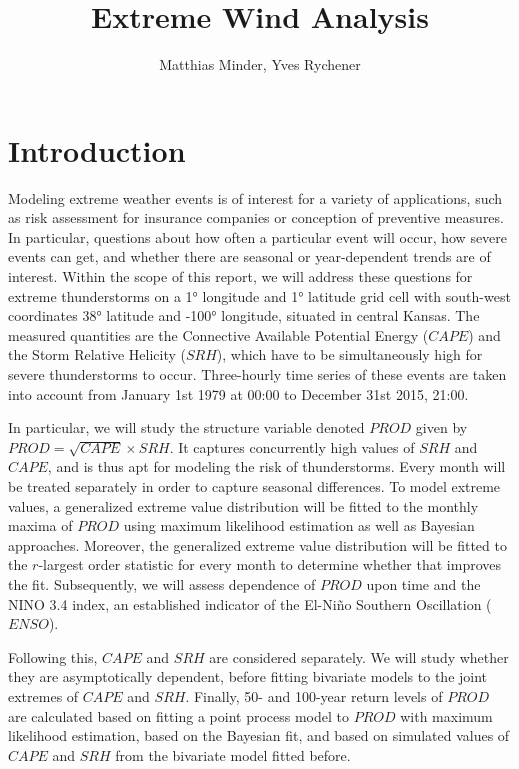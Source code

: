 \documentclass[10pt,conference,compsocconf]{IEEEtran}
\begin{document}
\title{Extreme Wind Analysis}

\author{
	Matthias Minder, Yves Rychener
}

\maketitle


\begin{abstract}

\end{abstract}

\section*{Introduction} 
Modeling extreme weather events is of interest for a variety of applications, such as risk assessment for insurance companies or conception of preventive measures. In particular, questions about how often a particular event will occur, how severe events can get, and whether there are seasonal or year-dependent trends are of interest. Within the scope of this report, we will address these questions for extreme thunderstorms on a 1° longitude and 1° latitude grid cell with south-west coordinates 38° latitude and -100° longitude, situated in central Kansas. The measured quantities are the Connective Available Potential Energy ($CAPE$) and the Storm Relative Helicity ($SRH$), which have to be simultaneously high for severe thunderstorms to occur. Three-hourly time series of these events are taken into account from January 1st 1979 at 00:00 to December 31st 2015, 21:00. 
\par
In particular, we will study the structure variable denoted $PROD$ given by $PROD = \sqrt{CAPE} \times SRH$. It captures concurrently high values of $SRH$ and $CAPE$, and is thus apt for modeling the risk of thunderstorms. Every month will be treated separately in order to capture seasonal differences. To model extreme values, a generalized extreme value distribution will be fitted to the monthly maxima of $PROD$ using maximum likelihood estimation as well as Bayesian approaches. Moreover, the generalized extreme value distribution will be fitted to the $r$-largest order statistic for every month to determine whether that improves the fit. Subsequently, we will assess dependence of $PROD$ upon time and the NINO 3.4 index, an established indicator of the El-Niño Southern Oscillation ($ENSO$). 
\par
Following this, $CAPE$ and $SRH$ are considered separately. We will study whether they are asymptotically dependent, before fitting bivariate models to the joint extremes of $CAPE$ and $SRH$. 
Finally, 50- and 100-year return levels of $PROD$ are calculated based on fitting a point process model to $PROD$ with maximum likelihood estimation, based on the Bayesian fit, and based on simulated values of $CAPE$ and $SRH$ from the bivariate model fitted before. 
\end{document}
